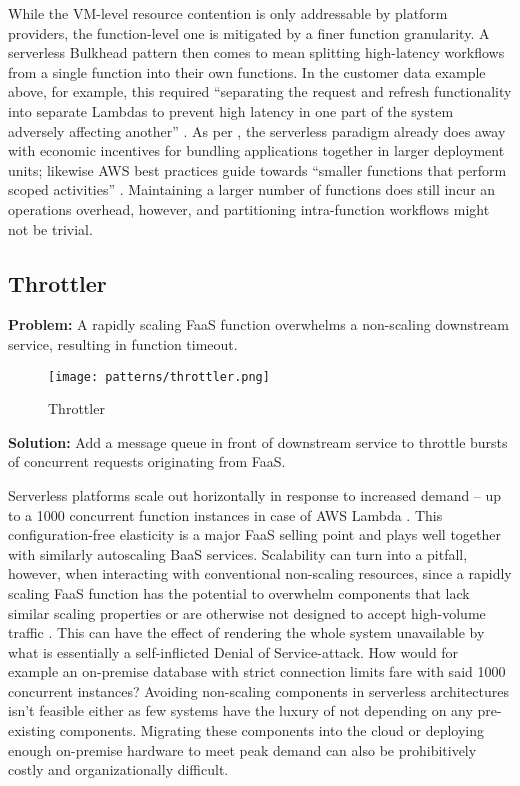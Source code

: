 While the VM-level resource contention is only addressable by platform providers, the function-level one is mitigated by a finer function granularity. A serverless Bulkhead pattern then comes to mean splitting high-latency workflows from a single function into their own functions. In the customer data example above, for example, this required ``separating the request and refresh functionality into separate Lambdas to prevent high latency in one part of the system adversely affecting another'' \parencite{bardsley18optimizationStrategies}. As per \textcite{adzic2017serverless}, the serverless paradigm already does away with economic incentives for bundling applications together in larger deployment units; likewise AWS best practices guide towards ``smaller functions that perform scoped activities'' \parencite{aws18serverlessLens}. Maintaining a larger number of functions does still incur an operations overhead, however, and partitioning intra-function workflows might not be trivial.


\subsection{Throttler} \label{subsec:throttler}

\textbf{Problem:} A rapidly scaling FaaS function overwhelms a non-scaling downstream service, resulting in function timeout.

\begin{figure}[h]
  \centering
  \texttt{[image: patterns/throttler.png]}
  \caption{Throttler}
  \label{fig:throttler}
\end{figure}

\textbf{Solution:} Add a message queue in front of downstream service to throttle bursts of concurrent requests originating from FaaS.

Serverless platforms scale out horizontally in response to increased demand -- up to a 1000 concurrent function instances in case of AWS Lambda \parencite{awslambda0218}. This configuration-free elasticity is a major FaaS selling point and plays well together with similarly autoscaling BaaS services. Scalability can turn into a pitfall, however, when interacting with conventional non-scaling resources, since a rapidly scaling FaaS function has the potential to overwhelm components that lack similar scaling properties or are otherwise not designed to accept high-volume traffic \parencite{cncf18serverlessWG}. This can have the effect of rendering the whole system unavailable by what is essentially a self-inflicted Denial of Service-attack. How would for example an on-premise database with strict connection limits fare with said 1000 concurrent instances? Avoiding non-scaling components in serverless architectures isn't feasible either as few systems have the luxury of not depending on any pre-existing components. Migrating these components into the cloud or deploying enough on-premise hardware to meet peak demand can also be prohibitively costly and organizationally difficult.

